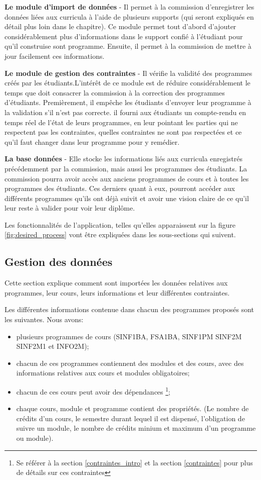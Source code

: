 \textbf{Le module d'import de données} - Il permet à la commission d'enregistrer les données liées aux curricula  à l'aide de plusieurs supports (qui seront expliqués en détail plus loin dans le chapitre). Ce module permet tout d'abord d'ajouter considérablement plus d'informations dans le support confié à l'étudiant pour qu'il construise sont programme. Ensuite, il permet à la commission de mettre à jour facilement ces informations. 
 
\textbf{Le module de gestion des contraintes} - Il vérifie la validité des programmes créés par les étudiants.L'intérêt de ce module est de réduire considérablement  le temps que doit consacrer la commission à la correction des programmes d'étudiants. Premièrement, il empêche les étudiants d'envoyer leur programme à la validation s'il n'est pas correcte. il fourni aux étudiants un compte-rendu en temps réel de l'état de leurs programmes, en leur pointant les parties qui ne respectent pas les contraintes, quelles contraintes ne sont pas respectées et ce qu'il faut changer dans leur programme pour y remédier.

\textbf{La base données} - Elle stocke les informations liés aux curricula enregistrés précédemment par la commission, mais aussi les programmes des étudiants. La commission pourra avoir accès aux anciens programmes de cours et à toutes les programmes des étudiants. Ces derniers quant à eux, pourront accéder aux différents programmes qu'ils ont déjà suivit et avoir une vision claire de ce qu'il leur reste à valider pour voir leur diplôme.

Les fonctionnalités de l'application, telles qu'elles apparaissent sur la figure \ref{fig:desired_process} vont être expliquées dans les sous-sections qui suivent.
\subsection{Gestion des données}
\label{data_mgmt}
Cette section explique comment sont importées les données relatives aux programmes, leur cours, leurs informations et leur différentes contraintes. 

Les différentes informations contenue dans chacun des programmes proposés sont les suivantes. Nous avons:
\begin{itemize}
\item plusieurs programmes de cours (SINF1BA, FSA1BA, SINF1PM SINF2M SINF2M1 et INFO2M);
\item chacun de ces programmes contiennent des modules et des cours, avec des informations relatives aux cours et modules obligatoires;
\item chacun de ces cours peut avoir des dépendances \footnote{Se référer à la section \ref{contraintes_intro} et la section \ref{contraintes} pour plus de détails sur ces contraintes};
\item chaque cours, module et programme contient des propriétés. (Le nombre de crédits d'un cours, le semestre durant lequel il est dispensé, l'obligation de suivre un module, le nombre de crédits minium et maximum d'un programme ou module).
\end{itemize}

